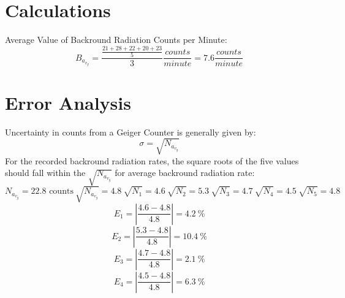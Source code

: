 \documentclass[12pt]{article}
\newcommand{\counts}{\text{ counts}}
\begin{document}
\section{Calculations}
\indent \indent Average Value of Backround Radiation Counts per Minute:
\[B_a_v_g = \frac{\frac{21+28+22+20+23}{5}}{3} \frac{counts}{minute} = 7.6 \frac{counts}{minute} \]

\section{Error Analysis}
\indent \indent Uncertainty in counts from a Geiger Counter is generally given by:
\[ \sigma = \sqrt{N_a_v_g} \]
\indent \indent For the recorded backround radiation rates, the square roots of the five values should fall within the $\sqrt{N_a_v_g}$ for average backround radiation rate:
\[ N_a_v_g = 22.8 \counts \
\sqrt{N_a_v_g} = 4.8 \
\sqrt{N_1} = 4.6 \
\sqrt{N_2} = 5.3 \
\sqrt{N_3} = 4.7 \
\sqrt{N_4} = 4.5 \
\sqrt{N_5} = 4.8 \ \]
\indent \indent %
\[E_1 = |\frac{4.6-4.8}{4.8}| = 4.2 \ \% \]
\[E_2 = |\frac{5.3-4.8}{4.8}| = 10.4 \ \% \]
\[E_3 = |\frac{4.7-4.8}{4.8}| = 2.1 \ \% \]
\[E_4 = |\frac{4.5-4.8}{4.8}| = 6.3 \ \% \]
\end{document}
